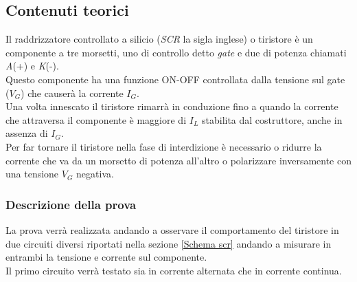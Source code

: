 \documentclass[12pt]{article}
\begin{document}
    \subsection{Contenuti teorici}
    Il raddrizzatore controllato a silicio (\textit{SCR} la sigla inglese) o tiristore è un componente a tre morsetti, uno di controllo detto \textit{gate} e due di potenza chiamati \textit{A}(+) e \textit{K}(-).\\
    Questo componente ha una funzione ON-OFF  controllata dalla tensione sul gate ($V_G$) che causerà la corrente $I_G$.\\
    Una volta innescato il tiristore rimarrà in conduzione fino a quando la corrente che attraversa il componente è maggiore di $I_L$ stabilita dal costruttore, anche in assenza di $I_G$.\\
Per far tornare il tiristore nella fase di interdizione è necessario o ridurre la corrente che va da un morsetto di potenza all'altro o polarizzare inversamente  con una tensione \textit{$V_G$} negativa. \\   \noindent

        \subsubsection{Descrizione della prova}
        La prova verrà realizzata andando a osservare il comportamento del tiristore in due circuiti diversi riportati nella sezione \ref{Schema scr} andando a misurare in entrambi la tensione e corrente sul componente.\\
        Il primo circuito verrà testato sia in corrente alternata che in corrente continua.\\
\end{document}
